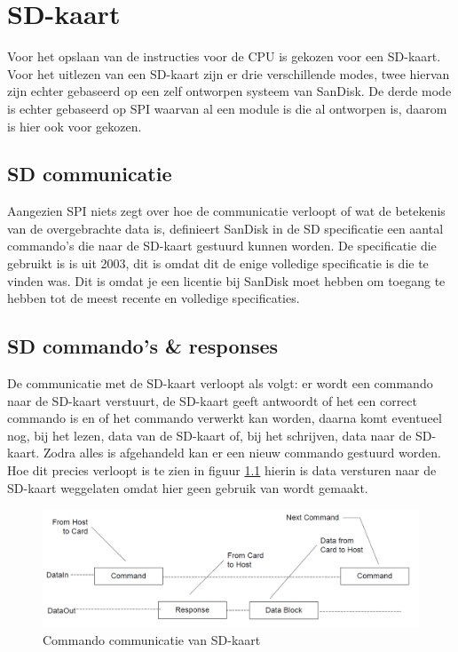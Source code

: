 \documentclass[oneside,dutch]{tudelft-report}
\begin{document}
\chapter{SD-kaart}
Voor het opslaan van de instructies voor de CPU is gekozen voor een SD-kaart. Voor het uitlezen van een SD-kaart zijn er drie verschillende modes, twee hiervan zijn echter gebaseerd op een zelf ontworpen systeem van SanDisk. De derde mode is echter gebaseerd op SPI waarvan al een module is die al ontworpen is, daarom is hier ook voor gekozen. 
\section{SD communicatie}
Aangezien SPI niets zegt over hoe de communicatie verloopt of wat de betekenis van de overgebrachte data is, definieert SanDisk in de SD specificatie een aantal commando’s die naar de SD-kaart gestuurd kunnen worden. De specificatie die gebruikt is is uit 2003, dit is omdat dit de enige volledige specificatie is die te vinden was. Dit is omdat je een licentie bij SanDisk moet hebben om toegang te hebben tot de meest recente en volledige specificaties.
\section{SD commando's \& responses}
De communicatie met de SD-kaart verloopt als volgt: er wordt een commando naar de SD-kaart verstuurt, de SD-kaart geeft antwoordt of het een correct commando is en of het commando verwerkt kan worden, daarna komt eventueel nog, bij het lezen, data van de SD-kaart of, bij het schrijven, data naar de SD-kaart. Zodra alles is afgehandeld kan er een nieuw commando gestuurd worden. Hoe dit precies verloopt is te zien in figuur \ref{sd-cmd-diagram} hierin is data versturen naar de SD-kaart weggelaten omdat hier geen gebruik van wordt gemaakt.

\begin{figure}[H]
\center
\includegraphics[width=14cm]{./sd_cmd_diagram}
\caption{Commando communicatie van SD-kaart}
\label{sd-cmd-diagram}
\end{figure}
\end{document}

